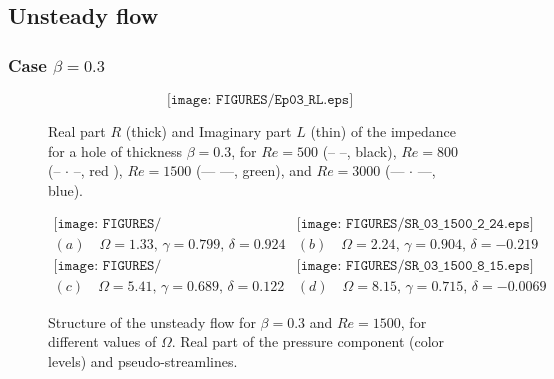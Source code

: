 \documentclass{jfm}
\begin{document}
\subsection{Unsteady flow}

\subsubsection{Case $\beta = 0.3$}


\begin{figure}
$$
\texttt{[image: FIGURES/Ep03\_RL.eps]}
$$
\caption{ Real part $R$ (thick) and Imaginary part $L$ (thin) of the impedance
for a hole of thickness $\beta = 0.3$, for %
$Re = 500$ (-- --, black),
$Re = 800$ (-- $\cdot$ --, red ),  $Re = 1500$ (---  ---, green),  and
$Re = 3000$ (--- $\cdot$ ---, blue). 
}
\label{fig:Cond03}
\end{figure}


\begin{figure}
$$
\begin{array}{cc}
\texttt{[image: FIGURES/SR\_03\_1500\_1\_33.eps]} &
\texttt{[image: FIGURES/SR\_03\_1500\_2\_24.eps]} \\
(a) \quad \Omega = 1.33, \, \gamma = 0.799,\, \delta =0.924 & 
(b) \quad \Omega = 2.24,  \, \gamma = 0.904,\, \delta =-0.219 \\
\texttt{[image: FIGURES/SR\_03\_1500\_5\_41.eps]} &
\texttt{[image: FIGURES/SR\_03\_1500\_8\_15.eps]} \\
(c) \quad \Omega = 5.41,  \, \gamma = 0.689,\, \delta =0.122 & 
(d) \quad \Omega = 8.15,  \, \gamma = 0.715,\, \delta =-0.0069
\end{array}
$$
\caption{ Structure of the unsteady flow for $\beta = 0.3$ and $Re = 1500$, for different values of $\Omega$.
Real part of the pressure component (color levels) and pseudo-streamlines. 
}
\label{fig:Struct03}
\end{figure}
\end{document}
